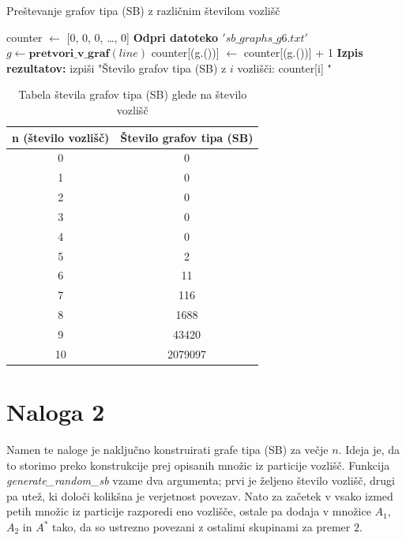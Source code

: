 \documentclass{article}
\begin{document}
\begin{algorithm}
    \caption{Preštevanje grafov tipa (SB) z različnim številom vozlišč}
    \begin{algorithmic}[1]
    \State counter $\gets$ [0, 0, 0, \dots, 0] 
    \State \textbf{Odpri datoteko $'sb\_graphs\_g6.txt'$}
        \State $g \gets \textbf{pretvori\_v\_graf}(line)$ 
        \State counter[(g.())] $\gets$ counter[(g.())] + 1
    \EndFor
    \State \textbf{Izpis rezultatov:}
        \State izpiši "Število grafov tipa (SB) z $i$ vozlišči: counter[i] "
    \EndFor
    \end{algorithmic}
 \end{algorithm}

 \begin{table}[h!]
    \centering
    \begin{tabular}{|c|c|}
    \hline
    \textbf{n (število vozlišč)} & \textbf{Število grafov tipa (SB)} \\
    \hline
    0 & 0 \\
    1 & 0 \\
    2 & 0 \\
    3 & 0 \\
    4 & 0 \\
    5 & 2 \\
    6 & 11 \\
    7 & 116\\
    8 & 1688\\
    9 & 43420 \\
    10 & 2079097 \\
    \hline
    \end{tabular}
    \caption{Tabela števila grafov tipa (SB) glede na število vozlišč}
    \end{table}

\section{Naloga 2}

Namen te naloge je naključno konstruirati grafe tipa (SB) za večje $n$.
Ideja je, da to storimo preko konstrukcije prej opisanih množic iz particije vozlišč.
Funkcija \emph{generate\_random\_sb} vzame dva argumenta; prvi je željeno število 
vozlišč, drugi pa utež, ki določi kolikšna je verjetnost povezav. Nato za začetek 
v vsako izmed petih množic iz particije razporedi eno vozlišče, ostale pa dodaja v množice 
$A_1$, $A_2$ in $A^*$ tako, da so ustrezno povezani z ostalimi skupinami za premer $2$.
\end{document}
